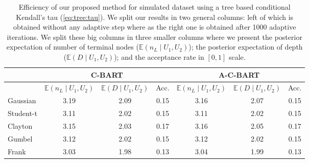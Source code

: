 \documentclass{amsart}
\begin{document}
\begin{table}[ht]
	\centering
	\begin{tabular}{l|ccc|ccc}
		\multicolumn{1}{c|}{} &
		\multicolumn{3}{c|}{C-BART} &
		\multicolumn{3}{c}{A-C-BART} \\
		\midrule
		& $\mathbb{E}(n_L\mid U_1,U_2)$ & $\mathbb{E}(D\mid U_1,U_2)$ & Acc. & $\mathbb{E}(n_L\mid U_1,U_2)$ & $\mathbb{E}(D\mid U_1,U_2)$ & Acc. \\ 
		\midrule
		Gaussian & 3.19 & 2.09 & 0.15 & 3.16 & 2.07 & 0.15 \\ 
		Student-t & 3.11 & 2.02 & 0.15 & 3.11 & 2.02 & 0.15 \\ 
		Clayton & 3.15 & 2.03 & 0.17 & 3.16 & 2.05 & 0.17 \\ 
		Gumbel & 3.12 & 2.02 & 0.15 & 3.12 & 2.02 & 0.15 \\ 
		Frank & 3.03 & 1.98 & 0.13 & 3.04 & 1.99 & 0.13 \\ 
	\end{tabular}
	\caption{Efficiency of our proposed method for simulated dataset using a tree based conditional Kendall's tau (\cref{eq:tree:tau}). We split our results in two general columns: left of which is obtained without any adaptive step where as the right one is obtained after 1000 adaptive iterations. We split these big columns in three smaller columns where we present the posterior expectation of number of terminal nodes ($\mathbb{E}(n_L\mid U_1,U_2)$); the posterior expectation of depth ($\mathbb{E}(D\mid U_1,U_2)$); and the acceptance rate in $[0,1]$ scale.}
	\label{tab:eff:ex1}
\end{table}
\end{document}
